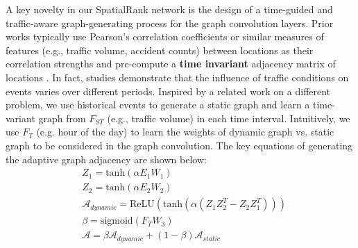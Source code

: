 \documentclass{article}
\def \A {\mathcal{A}}
\def \A {\mathcal{A}}
\begin{document}
A key novelty in our SpatialRank network is the design of a time-guided and traffic-aware graph-generating process for the graph convolution layers. Prior works typically use Pearson's correlation coefficients or similar measures of features (e.g., traffic volume, accident counts) between locations as their correlation strengths and pre-compute a \textbf{time invariant} adjacency matrix of locations \cite{Zhang2019TrafficGANOT}. In fact, studies \cite{Careye014319}\cite{MaoXinhua2019RFAT} demonstrate that the influence of traffic conditions on events varies over different periods. 
%
Inspired by a related work \cite{wu2020connecting} on a different problem, we use historical events to generate a static graph and learn a time-variant graph from $F_{ST}$ (e.g., traffic volume) in each time interval. %
Intuitively, we use $F_T$ (e.g. hour of the day) to learn the weights of dynamic graph vs. static graph to be considered in the graph convolution. The key equations of generating the adaptive graph adjacency are shown below:%
\begin{align} \label{eqn:graph}
& Z_1 = \text{tanh}(\alpha E_1 W_1) \\
& Z_2 = \text{tanh}(\alpha E_2 W_2) \\
& \A_{dynamic} = \text{ReLU}(\text{tanh}(\alpha(Z_1 Z_2^T - Z_2 Z_1 ^ T))) \\
& \beta = \text{sigmoid}(F_T W_3) \\
& \A = \beta \A_{dynamic} + (1 - \beta) \A_{static} 
\end{align}
\end{document}
